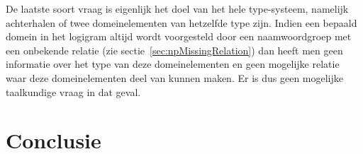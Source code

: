 De laatste soort vraag is eigenlijk het doel van het hele type-systeem, namelijk achterhalen of twee domeinelementen van hetzelfde type zijn. Indien een bepaald domein in het logigram altijd wordt voorgesteld door een naamwoordgroep met een onbekende relatie (zie sectie~\ref{sec:npMissingRelation}) dan heeft men geen informatie over het type van deze domeinelementen en geen mogelijke relatie waar deze domeinelementen deel van kunnen maken. Er is dus geen mogelijke taalkundige vraag in dat geval.

\section{Conclusie}
